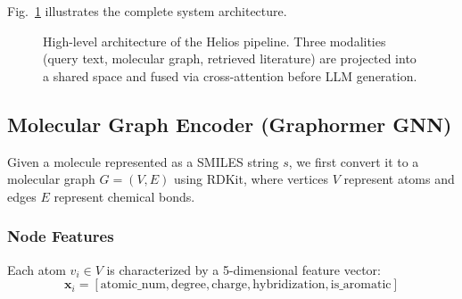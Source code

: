\documentclass[conference]{IEEEtran}
\begin{document}
Fig.~\ref{fig:architecture} illustrates the complete system architecture.

\begin{figure}[t]
    \centering
    \caption{High-level architecture of the Helios pipeline. Three modalities (query text, molecular graph, retrieved literature) are projected into a shared space and fused via cross-attention before LLM generation.}
    \label{fig:architecture}
\end{figure}

\subsection{Molecular Graph Encoder (Graphormer GNN)}

Given a molecule represented as a SMILES string $s$, we first convert it to a molecular graph $G = (V, E)$ using RDKit, where vertices $V$ represent atoms and edges $E$ represent chemical bonds.

\subsubsection{Node Features}
Each atom $v_i \in V$ is characterized by a 5-dimensional feature vector:
\begin{equation}
    \mathbf{x}_i = [\text{atomic\_num}, \text{degree}, \text{charge}, \text{hybridization}, \text{is\_aromatic}]
\end{equation}
\end{document}
